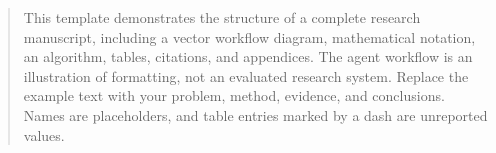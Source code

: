 \begin{abstract}
This template demonstrates the structure of a complete research manuscript,
including a vector workflow diagram, mathematical notation, an algorithm, tables,
citations, and appendices. The agent workflow
is an illustration of formatting, not an evaluated research system. Replace
the example text with your problem, method, evidence, and conclusions. Names
are placeholders, and table entries marked by a dash are unreported values.
\end{abstract}

